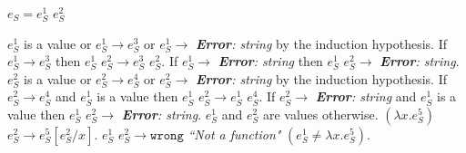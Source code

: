 \begin{case}

$e_{S}=e_{S}^{1}$ $e_{S}^{2}$

$e_{S}^{1}$ is a value or $e_{S}^{1}\rightarrow e_{S}^{3}$ or $e_{S}^{1}\rightarrow$ \emph{\textbf{Error}: string} by the induction hypothesis.  If $e_{S}^{1}\rightarrow e_{S}^{3}$ then $e_{S}^{1}$ $e_{S}^{2}\rightarrow e_{S}^{3}$ $e_{S}^{2}$.  If $e_{S}^{1}\rightarrow$ \emph{\textbf{Error}: string} then $e_{S}^{1}$ $e_{S}^{2}\rightarrow$ \emph{\textbf{Error}: string}.  $e_{S}^{2}$ is a value or $e_{S}^{2}\rightarrow e_{S}^{4}$ or $e_{S}^{2}\rightarrow$ \emph{\textbf{Error}: string} by the induction hypothesis.  If $e_{S}^{2}\rightarrow e_{S}^{4}$ and $e_{S}^{1}$ is a value then $e_{S}^{1}$ $e_{S}^{2}\rightarrow e_{S}^{1}$ $e_{S}^{4}$.  If $e_{S}^{2}\rightarrow$ \emph{\textbf{Error}: string} and $e_{S}^{1}$ is a value then $e_{S}^{1}$ $e_{S}^{2}\rightarrow$ \emph{\textbf{Error}: string}.  $e_{S}^{1}$ and $e_{S}^{2}$ are values otherwise.  $(\lambda x.e_{S}^{5})$ $e_{S}^{2}\rightarrow e_{S}^{5}[e_{S}^{2}/x]$.  $e_{S}^{1}$ $e_{S}^{2}\rightarrow\mathtt{wrong}$ \emph{``Not a function"} $(e_{S}^{1}\neq\lambda x.e_{S}^{5})$.

\end{case}